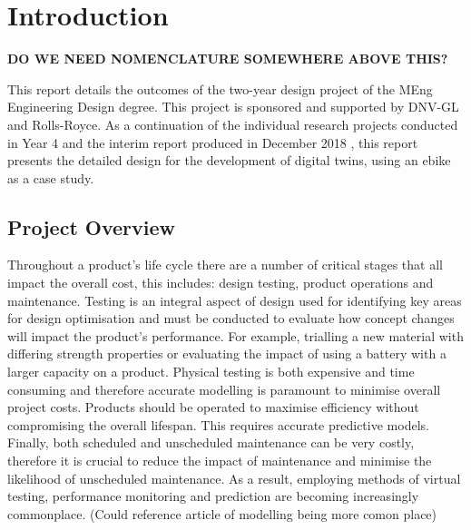 \documentclass[a4paper, 10pt]{article}
\numberwithin{equation}{section}
\begin{document}
\newpage
{}
\tableofcontents

\newpage
\listoffigures
\newpage
 
\listoftables

\newpage
{}

\section{Introduction}

\textbf{DO WE NEED NOMENCLATURE SOMEWHERE ABOVE THIS?}

This report details the outcomes of the two-year design project of the MEng Engineering Design degree. This project is sponsored and supported by DNV-GL and Rolls-Royce. As a continuation of the individual research projects conducted in Year 4 \cite{report:motor}\cite{report:energy}\cite{report:dynamics}\cite{report:structural}\cite{report:drivechain} and the interim report produced in December 2018 \cite{interim_report}, this report presents the detailed design for the development of digital twins, using an ebike as a case study.

\subsection{Project Overview}

Throughout a product's life cycle there are a number of critical stages that all impact the overall cost, this includes: design testing, product operations and maintenance. Testing is an integral aspect of design used for identifying key areas for design optimisation and must be conducted to evaluate how concept changes will impact the product's performance. For example, trialling a new material with differing strength properties or evaluating the impact of using a battery with a larger capacity on a product. Physical testing is both expensive and time consuming and therefore accurate modelling is paramount to minimise overall project costs. Products should be operated to maximise efficiency without compromising the overall lifespan. This requires accurate predictive models. Finally, both scheduled and unscheduled maintenance can be very costly, therefore it is crucial to reduce the impact of maintenance and minimise the likelihood of unscheduled maintenance. As a result, employing methods of virtual testing, performance monitoring and prediction are becoming increasingly commonplace. (Could reference article of modelling being more comon place)
\end{document}
